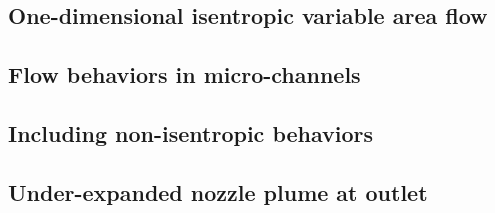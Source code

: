 \subsection{One-dimensional isentropic variable area flow}\label{sec:one-dim-isentropic}
	
	\newpage

\subsection{Flow behaviors in micro-channels}\label{sec:micro-channels}
	
	\newpage

\subsection{Including non-isentropic behaviors}\label{sec:disconnected-reservoirs}
	
	\newpage

\subsection{Under-expanded nozzle plume at outlet}\label{sec:outlet_plume}
	
	\newpage
